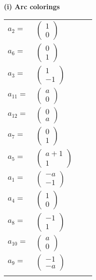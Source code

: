 \documentclass[1p]{elsarticle_modified}
\theoremstyle{definition}
\begin{document}
\flushleft \textbf{(i) Arc colorings}\\
\begin{tabular}{m{7pt} m{180pt} m{7pt} m{180pt} }
\flushright $a_{2}=$&$\begin{pmatrix}1\\0\end{pmatrix}$ \\
\flushright $a_{6}=$&$\begin{pmatrix}0\\1\end{pmatrix}$ \\
\flushright $a_{3}=$&$\begin{pmatrix}1\\-1\end{pmatrix}$ \\
\flushright $a_{11}=$&$\begin{pmatrix}a\\0\end{pmatrix}$ \\
\flushright $a_{12}=$&$\begin{pmatrix}0\\a\end{pmatrix}$ \\
\flushright $a_{7}=$&$\begin{pmatrix}0\\1\end{pmatrix}$ \\
\flushright $a_{5}=$&$\begin{pmatrix}a+1\\1\end{pmatrix}$ \\
\flushright $a_{1}=$&$\begin{pmatrix}- a\\-1\end{pmatrix}$ \\
\flushright $a_{4}=$&$\begin{pmatrix}1\\0\end{pmatrix}$ \\
\flushright $a_{8}=$&$\begin{pmatrix}-1\\1\end{pmatrix}$ \\
\flushright $a_{10}=$&$\begin{pmatrix}a\\0\end{pmatrix}$ \\
\flushright $a_{9}=$&$\begin{pmatrix}-1\\- a\end{pmatrix}$\\&\end{tabular}
\end{document}
